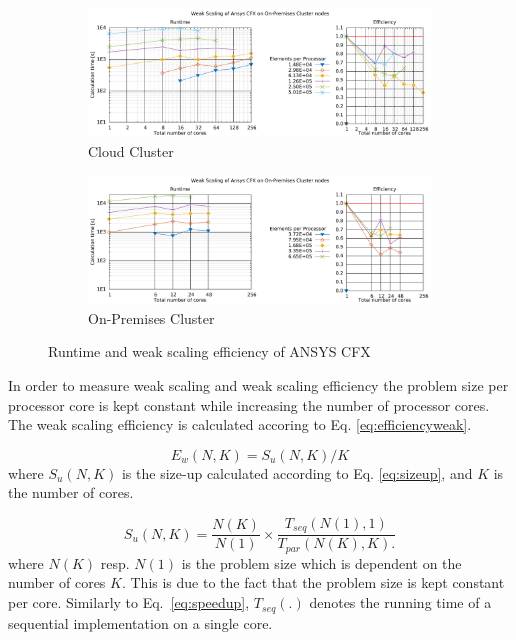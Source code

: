 \documentclass[3p,times]{elsarticle}
\begin{document}
\begin{figure}

	\begin{subfigure}{\linewidth}
		\centering
		\includegraphics[width=.7\linewidth]{gplt-a8-weak-pipe}	
		\caption{Cloud Cluster}
		\label{fig:weakA8}
	\end{subfigure}

	\begin{subfigure}{\linewidth}
		\centering
		\includegraphics[width=.7\linewidth]{gplt-hsr-weak-pipe}
		\caption{On-Premises Cluster}
		\label{fig:weakHSR}
	\end{subfigure}
	
	\caption{Runtime and weak scaling efficiency of ANSYS CFX}

\end{figure}



In order to measure weak scaling and weak scaling efficiency the problem size per processor core is kept constant while increasing the number of processor cores. The weak scaling efficiency is calculated accoring to Eq. \ref{eq:efficiencyweak}.



\begin{equation}
	\label{eq:efficiencyweak}
	E_w(N,K) = S_u(N,K) / K
\end{equation}
where $S_u(N,K)$ is the size-up calculated according to Eq. \ref{eq:sizeup}, and $K$ is the number of cores.

\begin{equation}
\label{eq:sizeup}
S_u(N,K) = \frac{N(K)}{N(1)} \times \frac{T_{seq}(N(1),1)}{T_{par}(N(K),K).}
\end{equation}
where $N(K)$ resp. $N(1)$ is the problem size which is dependent on the number of cores $K$. This is due to the fact that the problem size is kept constant per core.
 Similarly to Eq.~\ref{eq:speedup}, $T_{seq}(.)$ denotes the running time of a sequential implementation on a single core. 
\end{document}

